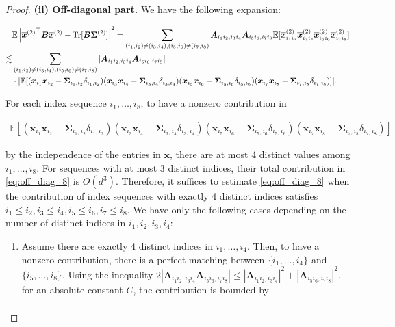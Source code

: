 \documentclass[twoside,11pt]{article}
\newcommand{\E}{\mathbb{E}}
\def\bA{{\boldsymbol A}}
\def\bB{{\boldsymbol B}}
\def\bx{{\boldsymbol x}}
\def\bSigma{{\boldsymbol \Sigma}}
\newcommand{\Tr}{\operatorname{Tr}}
\newcommand{\1}{\mathbf{1}}
\begin{document}
\begin{proof}
\textbf{ (ii) Off-diagonal part.} We have the following expansion:
\begin{small}
\begin{align}
    &\E\left| {\overline\bx^{(2)}}^\top \bB\overline\bx^{(2)}-\Tr[\bB\bSigma^{(2)}]\right|^2 
    =\sum_{(i_1,i_2)\not=(i_3,i_4), (i_5,i_6)\not=(i_7,i_8)}\bA_{i_1i_2,i_3i_4}\bA_{i_5i_6,i_7i_8}\E[\overline\bx^{(2)}_{i_1i_2}\overline\bx^{(2)}_{i_3i_4}\overline\bx^{(2)}_{i_5i_6}\overline\bx^{(2)}_{i_7i_8}] \notag\\
    \lesssim & \sum_{(i_1,i_2)\not=(i_3,i_4), (i_5,i_6)\not=(i_7,i_8)} |\bA_{i_1i_2,i_3i_4}\bA_{i_5i_6,i_7i_8}|\label{eq:off_diag_8}\\
    &\cdot| \E[(\bx_{i_1}\bx_{i_2}-\bSigma_{i_1,i_2}\delta_{i_1,i_2})(\bx_{i_3}\bx_{i_4}-\bSigma_{i_3,i_4}\delta_{i_3,i_4})(\bx_{i_5}\bx_{i_6}-\bSigma_{i_5,i_6}\delta_{i_5,i_6})(\bx_{i_7}\bx_{i_8}-\bSigma_{i_7,i_8}\delta_{i_7,i_8})]|. 
\end{align}
\end{small}
For each index sequence $i_1,\dots, i_8$, to have a nonzero contribution in 
\begin{small}
\begin{align}\label{eq:i8}
\E[(\bx_{i_1}\bx_{i_2}-\bSigma_{i_1,i_2}\delta_{i_1,i_2})(\bx_{i_3}\bx_{i_4}-\bSigma_{i_3,i_4}\delta_{i_3,i_4})(\bx_{i_5}\bx_{i_6}-\bSigma_{i_5,i_6}\delta_{i_5,i_6})(\bx_{i_7}\bx_{i_8}-\bSigma_{i_7,i_8}\delta_{i_7,i_8})]
\end{align}
\end{small}
by the independence of the entries in $\bx$, there are at most 4 distinct values among $i_1,\dots, i_8$.  For sequences with at most 3 distinct indices, their total contribution in \eqref{eq:off_diag_8} is $O(d^3)$. Therefore, it suffices to estimate \eqref{eq:off_diag_8} when the contribution of index sequences with exactly 4 distinct indices satisfies $i_1\leq i_2,   i_3\leq i_4,  i_5\leq i_6,  i_7\leq i_8$. We have only the following cases depending on the number of distinct indices in $i_1,i_2,i_3,i_4$:
\begin{enumerate}
    \item Assume there are exactly 4 distinct indices in $i_1,\dots,i_4$. Then, to have a nonzero contribution, there is a perfect matching between $\{i_1,\dots, i_4\}$ and $\{i_5,\dots, i_8\}$. Using the inequality $2|\bA_{i_1i_2,i_3i_4}\bA_{i_5i_6,i_7i_8}|\leq |\bA_{i_1i_2,i_3i_4}|^2+|\bA_{i_5i_6,i_7i_8}|^2$, for an absolute constant $C$, the contribution is bounded by 
    \begin{align}

\end{align}
\end{enumerate}
\end{proof}
\end{document}
